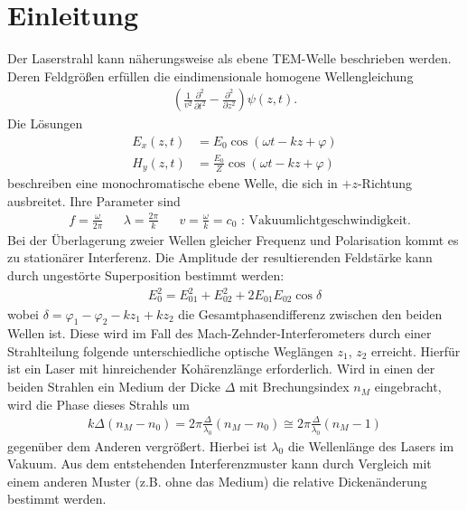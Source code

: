 \section{Einleitung}

Der Laserstrahl kann näherungsweise als ebene TEM-Welle beschrieben werden. Deren Feldgrößen erfüllen die eindimensionale homogene Wellengleichung
	\begin{align*}
	\left(\frac{1}{v^2}\frac{\partial^2}{\partial t^2} - \frac{\partial^2}{\partial z^2}\right)\psi(z,t).
	\end{align*}
Die Lösungen
	\begin{align*}
	E_x(z,t) &=E_{0}\cos(\omega t - kz + \varphi)\\
	H_y(z,t) &=\frac{E_{0}}{Z}\cos(\omega t - kz + \varphi)
	\end{align*}
beschreiben eine monochromatische ebene Welle, die sich in $+z$-Richtung ausbreitet. Ihre Parameter sind
	\begin{align*}
	& f=\frac{\omega}{2\pi} &&\lambda=\frac{2\pi}{k} && v = \frac{\omega}{k} = c_0 \mbox{ : Vakuumlichtgeschwindigkeit.}
	\end{align*}
Bei der Überlagerung zweier Wellen gleicher Frequenz und Polarisation kommt es zu stationärer Interferenz. Die Amplitude der resultierenden Feldstärke kann durch ungestörte Superposition bestimmt werden:
	\begin{align*}
	E_0^2 = E_{01}^2+ E_{02}^2 + 2 E_{01} E_{02} \cos\delta
	\end{align*}
wobei $\delta = \varphi_1-\varphi_2 - kz_1 + kz_2$ die Gesamtphasendifferenz zwischen den beiden Wellen ist. Diese wird im Fall des Mach-Zehnder-Interferometers durch einer Strahlteilung folgende unterschiedliche optische Weglängen $z_1$, $z_2$ erreicht. Hierfür ist ein Laser mit hinreichender Kohärenzlänge erforderlich. Wird in einen der beiden Strahlen ein Medium der Dicke $\Delta$ mit Brechungsindex $n_M$ eingebracht, wird die Phase dieses Strahls um 
	\begin{align*}
	k\Delta(n_M - n_0) = 2\pi\frac{\Delta}{\lambda_0}(n_M-n_0) \cong 2\pi\frac{\Delta}{\lambda_0}(n_M-1)
	\end{align*}
gegenüber dem Anderen vergrößert. Hierbei ist $\lambda_0$ die Wellenlänge des Lasers im Vakuum. Aus dem entstehenden Interferenzmuster kann durch Vergleich mit einem anderen Muster (z.B. ohne das Medium) die relative Dickenänderung bestimmt werden.